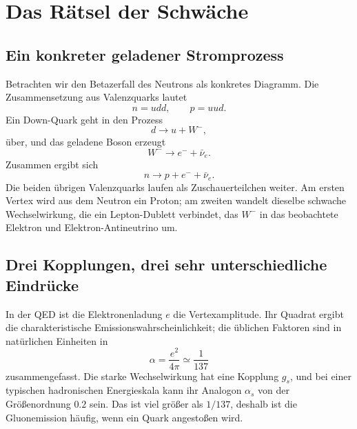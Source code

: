 \section{Das Rätsel der Schwäche}

\subsection{Ein konkreter geladener Stromprozess}

Betrachten wir den Betazerfall des Neutrons als konkretes Diagramm. Die Zusammensetzung aus Valenzquarks lautet
\begin{equation}
  n=udd,\qquad p=uud.
\end{equation}
Ein Down-Quark geht in den Prozess
\begin{equation}
  d\longrightarrow u+W^-,
\end{equation}
über, und das geladene Boson erzeugt
\begin{equation}
  W^-\longrightarrow e^-+\bar\nu_e.
\end{equation}
Zusammen ergibt sich
\begin{equation}
  n\longrightarrow p+e^-+\bar\nu_e.
\end{equation}
Die beiden übrigen Valenzquarks laufen als Zuschauerteilchen weiter. Am ersten Vertex wird aus dem Neutron ein Proton; am zweiten wandelt dieselbe schwache Wechselwirkung, die ein Lepton-Dublett verbindet, das \(W^-\) in das beobachtete Elektron und Elektron-Antineutrino um.

\subsection{Drei Kopplungen, drei sehr unterschiedliche Eindrücke}

In der QED ist die Elektronenladung \(e\) die Vertexamplitude. Ihr Quadrat ergibt die charakteristische Emissionswahrscheinlichkeit; die üblichen Faktoren sind in natürlichen Einheiten in
\begin{equation}
  \alpha=\frac{e^2}{4\pi}\simeq\frac1{137}
\end{equation}
zusammengefasst. Die starke Wechselwirkung hat eine Kopplung \(g_s\), und bei einer typischen hadronischen Energieskala kann ihr Analogon \(\alpha_s\) von der Größenordnung \(0.2\) sein. Das ist viel größer als \(1/137\), deshalb ist die Gluonemission häufig, wenn ein Quark angestoßen wird.

